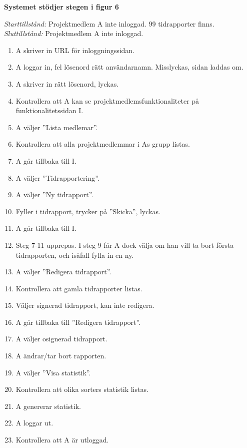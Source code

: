 \documentclass[a4paper]{article}
\begin{document}
\begin{ST}
\item
\textbf{Systemet stödjer stegen i figur 6}

\emph{Starttillstånd:} Projektmedlem A inte inloggad. 99 tidrapporter finns.\\
\emph{Sluttillstånd:} Projektmedlem A inte inloggad.\\

\begin{enumerate}

\item A skriver in URL för inloggningssidan.
\item A loggar in, fel lösenord rätt användarnamn. Misslyckas, sidan laddas om.
\item A skriver in rätt lösenord, lyckas.
\item Kontrollera att A kan se projektmedlemsfunktionaliteter på funktionalitetssidan I.
\item A väljer ''Lista medlemar''.
\item Kontrollera att alla projektmedlemmar i As grupp listas.
\item A går tillbaka till I.
\item A väljer ''Tidrapportering''.
\item A väljer ''Ny tidrapport''.
\item Fyller i tidrapport, trycker på ''Skicka'', lyckas.
\item A går tillbaka till I.
\item Steg 7-11 upprepas. I steg 9 får A dock välja om han vill ta bort första tidrapporten, och isåfall fylla in en ny.
\item A väljer ''Redigera tidrapport''.
\item Kontrollera att gamla tidrapporter listas.
\item Väljer signerad tidrapport, kan inte redigera.
\item A går tillbaka till ''Redigera tidrapport''.
\item A väljer osignerad tidrapport.
\item A ändrar/tar bort rapporten.
\item A väljer ''Visa statistik''.
\item Kontrollera att olika sorters statistik listas.
\item A genererar statistik.
\item A loggar ut.
\item Kontrollera att A är utloggad.

\end {enumerate}



\end{ST}
\end{document}
